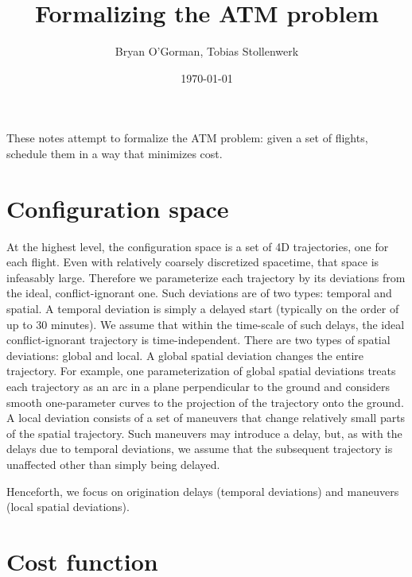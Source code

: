 \documentclass{article}
\title{Formalizing the ATM problem}
\author{Bryan O'Gorman, Tobias Stollenwerk}
\date{\today}
\begin{document}
\maketitle

These notes attempt to formalize the ATM problem: given a set of flights, schedule them in a way that minimizes cost.

\section{Configuration space}

At the highest level, the configuration space is a set of 4D trajectories, one for each flight.
Even with relatively coarsely discretized spacetime, that space is infeasably large.
Therefore we parameterize each trajectory by its deviations from the ideal, conflict-ignorant one.
Such deviations are of two types: temporal and spatial. 
A temporal deviation is simply a delayed start (typically on the order of up to 30 minutes). 
We assume that within the time-scale of such delays, the ideal conflict-ignorant trajectory is time-independent.
There are two types of spatial deviations: global and local.
A global spatial deviation changes the entire trajectory.
For example, one parameterization of global spatial deviations treats each trajectory as an arc in a plane perpendicular to the ground and considers smooth one-parameter curves to the projection of the trajectory onto the ground.
A local deviation consists of a set of maneuvers that change relatively small parts of the spatial trajectory.
Such maneuvers may introduce a delay, but, as with the delays due to temporal deviations, we assume that the subsequent trajectory is unaffected other than simply being delayed.

Henceforth, we focus on origination delays (temporal deviations) and maneuvers (local spatial deviations).

\section{Cost function}
\end{document}
